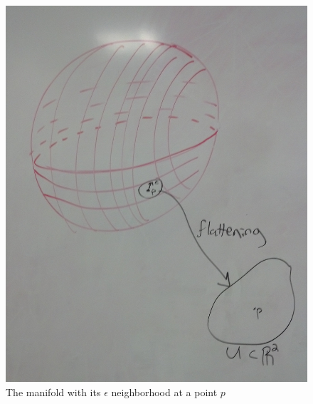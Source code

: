 
\begin{figure}[ht]
\centering
\includegraphics[width=\columnwidth]{manifolddiagram.jpg}
\caption{The manifold with its $\epsilon$ neighborhood at a point $p$}
\label{manifolddiagram}
\end{figure}
